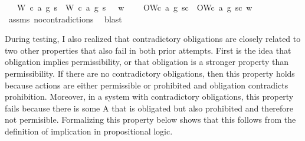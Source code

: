 \begin{isabellebody}
\ \ \ {\isachardoublequoteopen}{\isacharparenleft}{\isacharparenleft}{\isacharparenleft}W\ {\isacharparenleft}c{}{\isacharcomma}\ a{}{\isacharcomma}\ g{}{\isacharparenright}\ s{\isacharparenright}\ \isactrlbold {\isasymand}\ {\isacharparenleft}W\ {\isacharparenleft}c{}{\isacharcomma}\ a{}{\isacharcomma}\ g{}{\isacharparenright}\ s{\isacharparenright}{\isacharparenright}\ \isactrlbold {\isasymrightarrow}\ \isactrlbold {\isasymbottom}{\isacharparenright}\ w{\isachardoublequoteclose}\isanewline
\ \ \ {\isachardoublequoteopen}\isactrlbold {\isasymnot}\ {\isacharparenleft}O{\isacharbraceleft}W{\isacharparenleft}c{}{\isacharcomma}\ a{}{\isacharcomma}\ g{}{\isacharparenright}\ s{\isacharbar}c{\isacharbraceright}\ \isactrlbold {\isasymand}\ O{\isacharbraceleft}W{\isacharparenleft}c{}{\isacharcomma}\ a{}{\isacharcomma}\ g{}{\isacharparenright}\ s{\isacharbar}c{\isacharbraceright}{\isacharparenright}\ w{\isachardoublequoteclose}\isanewline
%
\isadelimproof
\ \ %
\endisadelimproof
%
\isatagproof
{}\isamarkupfalse%
\ assms\ no{\isacharunderscore}contradictions\ \isamarkupfalse%
\ blast\isanewline
%
%
\endisatagproof
{\isafoldproof}%
%
\isadelimproof
%
\endisadelimproof
%
\begin{isamarkuptext}%
During testing, I also realized that contradictory obligations are closely related to two other properties
that also fail in both prior attempts. First is the idea that obligation implies permissibility, or 
that obligation is a stronger property than permissibility. If there are no contradictory obligations, 
then this property holds because actions are either permissible or prohibited and obligation contradicts
prohibition. Moreover, in a system with contradictory obligations, this property fails because there is some
A that is obligated but also prohibited and therefore not permisible. Formalizing this property below shows 
that this follows from the definition of implication in propositional logic.


\end{isamarkuptext}
\end{isabellebody}
